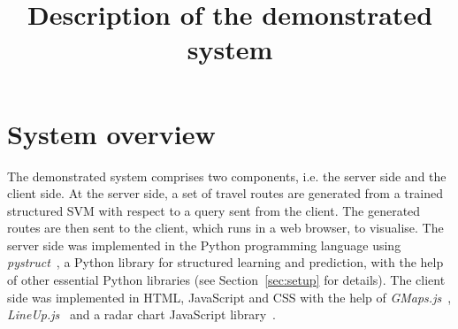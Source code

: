 \documentclass[sigconf]{acmart}
\begin{document}
\title{Description of the demonstrated system}
\maketitle

\thispagestyle{empty}

\section{System overview}
\label{sec:overview}
The demonstrated system comprises two components, i.e. the server side and the client side.
At the server side, a set of travel routes are generated from a trained structured SVM with respect to
a query sent from the client. 
The generated routes are then sent to the client, which runs in a web browser, to visualise.
The server side was implemented in the Python programming language using \textit{pystruct}~\cite{JMLR:v15:mueller14a},
a Python library for structured learning and prediction,
with the help of other essential Python libraries (see Section~\ref{sec:setup} for details).
The client side was implemented in HTML, JavaScript and CSS with the help of \textit{GMaps.js}~\cite{gmaps.js}, \textit{LineUp.js}~\cite{lineup.js} and a radar chart JavaScript library~\cite{radarchart.js}.


\end{document}

